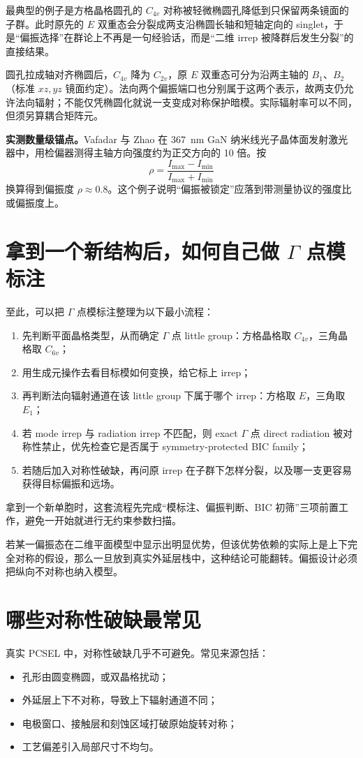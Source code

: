 最典型的例子是方格晶格圆孔的 $C_{4v}$ 对称被轻微椭圆孔降低到只保留两条镜面的子群。此时原先的 $E$ 双重态会分裂成两支沿椭圆长轴和短轴定向的 singlet，于是“偏振选择”在群论上不再是一句经验话，而是“二维 irrep 被降群后发生分裂”的直接结果。

圆孔拉成轴对齐椭圆后，$C_{4v}$ 降为 $C_{2v}$，原 $E$ 双重态可分为沿两主轴的 $B_1$、$B_2$（标准 $xz,yz$ 镜面约定）。法向两个偏振端口也分别属于这两个表示，故两支仍允许法向辐射；不能仅凭椭圆化就说一支变成对称保护暗模。实际辐射率可以不同，但须另算耦合矩阵元。

\begin{ExampleBox}
\textbf{实测数量级锚点。}Vafadar 与 Zhao 在 \SI{367}{nm} GaN 纳米线光子晶体面发射激光器中，用检偏器测得主轴方向强度约为正交方向的 10 倍。按
\[
\rho=\frac{I_{\max}-I_{\min}}{I_{\max}+I_{\min}}
\]
换算得到偏振度 $\rho\approx0.8$\cite{vafadar2023uvpc}。这个例子说明“偏振被锁定”应落到带测量协议的强度比或偏振度上。
\end{ExampleBox}

\section{拿到一个新结构后，如何自己做 \texorpdfstring{$\Gamma$}{Gamma} 点模标注}
至此，可以把 $\Gamma$ 点模标注整理为以下最小流程：
\begin{enumerate}
  \item 先判断平面晶格类型，从而确定 $\Gamma$ 点 little group：方格晶格取 $C_{4v}$，三角晶格取 $C_{6v}$；
  \item 用生成元操作去看目标模如何变换，给它标上 irrep；
  \item 再判断法向辐射通道在该 little group 下属于哪个 irrep：方格取 $E$，三角取 $E_1$；
  \item 若 mode irrep 与 radiation irrep 不匹配，则 exact $\Gamma$ 点 direct radiation 被对称性禁止，优先检查它是否属于 symmetry-protected BIC family；
  \item 若随后加入对称性破缺，再问原 irrep 在子群下怎样分裂，以及哪一支更容易获得目标偏振和远场。
\end{enumerate}
拿到一个新单胞时，这套流程先完成“模标注、偏振判断、BIC 初筛”三项前置工作，避免一开始就进行无约束参数扫描。

若某一偏振态在二维平面模型中显示出明显优势，但该优势依赖的实际上是上下完全对称的假设，那么一旦放到真实外延层栈中，这种结论可能翻转。偏振设计必须把纵向不对称也纳入模型。

\section{哪些对称性破缺最常见}
真实 PCSEL 中，对称性破缺几乎不可避免。常见来源包括：
\begin{itemize}
  \item 孔形由圆变椭圆，或双晶格扰动；
  \item 外延层上下不对称，导致上下辐射通道不同；
  \item 电极窗口、接触层和刻蚀区域打破原始旋转对称；
  \item 工艺偏差引入局部尺寸不均匀。
\end{itemize}

